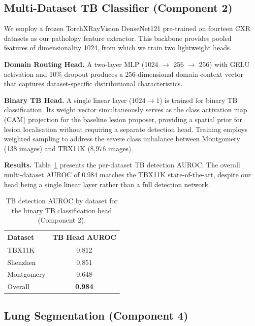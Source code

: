 \documentclass{article}
\begin{document}
\subsection{Multi-Dataset TB Classifier (Component 2)}

We employ a frozen TorchXRayVision DenseNet121 \cite{cohen2022torchxrayvision, huang2017densenet} pre-trained on fourteen CXR datasets as our pathology feature extractor. This backbone provides pooled features of dimensionality 1024, from which we train two lightweight heads.

\textbf{Domain Routing Head.} A two-layer MLP (1024 $\rightarrow$ 256 $\rightarrow$ 256) with GELU activation and 10\% dropout produces a 256-dimensional domain context vector that captures dataset-specific distributional characteristics.

\textbf{Binary TB Head.} A single linear layer ($1024 \rightarrow 1$) is trained for binary TB classification. Its weight vector simultaneously serves as the class activation map (CAM) projection for the baseline lesion proposer, providing a spatial prior for lesion localisation without requiring a separate detection head. Training employs weighted sampling to address the severe class imbalance between Montgomery (138 images) and TBX11K (8,976 images).

\textbf{Results.} Table~\ref{tab:tb_head} presents the per-dataset TB detection AUROC. The overall multi-dataset AUROC of 0.984 matches the TBX11K state-of-the-art, despite our head being a single linear layer rather than a full detection network.

\begin{table}[t]
\caption{TB detection AUROC by dataset for the binary TB classification head (Component 2).}
\label{tab:tb_head}
\vskip 0.1in
\centering
\begin{tabular}{lc}
\toprule
Dataset & TB Head AUROC \\
\midrule
TBX11K & 0.812 \\
Shenzhen & 0.851 \\
Montgomery & 0.648 \\
Overall & \textbf{0.984} \\
\bottomrule
\end{tabular}
\end{table}

\subsection{Lung Segmentation (Component 4)}
\end{document}
